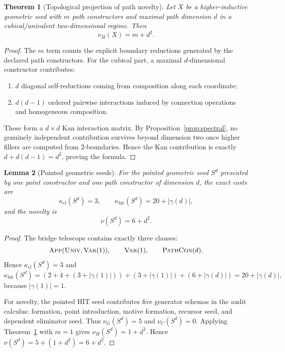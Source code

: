 \documentclass{lmcs}
\theoremstyle{plain}
\newtheorem{thm}{Theorem}[section]
\newtheorem{lem}[thm]{Lemma}
\theoremstyle{definition}
\theoremstyle{remark}
\begin{document}
\begin{thm}[Topological projection of path novelty]
\label{thm:nuH}
Let $X$ be a higher-inductive geometric seed with $m$ path constructors and maximal path dimension $d$ in a cubical/univalent two-dimensional regime.
Then
\[
  \nu_H(X)=m+d^2.
\]
\end{thm}

\begin{proof}
The $m$ term counts the explicit boundary reductions generated by the declared path constructors.
For the cubical part, a maximal $d$-dimensional constructor contributes:
\begin{enumerate}[label=(\alph*),nosep]
  \item $d$ diagonal self-reductions coming from composition along each coordinate;
  \item $d(d-1)$ ordered pairwise interactions induced by connection operations and homogeneous composition.
\end{enumerate}
These form a $d\times d$ Kan interaction matrix.
By Proposition~\ref{prop:spectral}, no genuinely independent contribution survives beyond dimension two once higher fillers are computed from 2-boundaries.
Hence the Kan contribution is exactly $d+d(d-1)=d^2$, proving the formula.
\end{proof}

\begin{lem}[Pointed geometric seeds]
\label{lem:pointed-seed}
For the pointed geometric seed $S^d$ presented by one point constructor and one path constructor of dimension $d$, the exact costs are
\[
  \kappa_{\mathrm{cl}}(S^d)=3,\qquad
  \kappa_{\mathrm{bit}}(S^d)=20+|\gamma(d)|,
\]
and the novelty is
\[
  \nu(S^d)=6+d^2.
\]
\end{lem}

\begin{proof}
The bridge telescope contains exactly three clauses:
\[
  \textsc{App}(\textsc{Univ},\textsc{Var}(1)),\qquad
  \textsc{Var}(1),\qquad
  \textsc{PathCon}(d).
\]
Hence $\kappa_{\mathrm{cl}}(S^d)=3$ and
\[
  \kappa_{\mathrm{bit}}(S^d)
  =(2+4+(3+|\gamma(1)|))+(3+|\gamma(1)|)+(6+|\gamma(d)|)
  =20+|\gamma(d)|,
\]
because $|\gamma(1)|=1$.

For novelty, the pointed HIT seed contributes five generator schemas in the audit calculus: formation, point introduction, motive formation, recursor seed, and dependent eliminator seed.
Thus $\nu_G(S^d)=5$ and $\nu_C(S^d)=0$.
Applying Theorem~\ref{thm:nuH} with $m=1$ gives $\nu_H(S^d)=1+d^2$.
Hence $\nu(S^d)=5+(1+d^2)=6+d^2$.
\end{proof}
\end{document}
